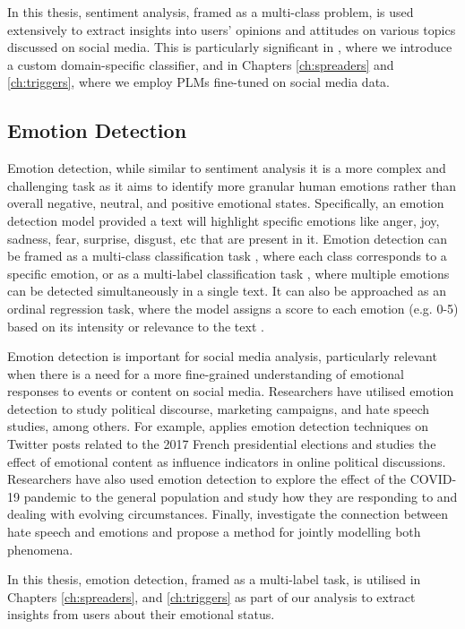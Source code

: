 In this thesis, sentiment analysis, framed as a multi-class problem,  is used extensively to extract insights into users' opinions and attitudes on various topics discussed on social media. This is particularly significant in  , where we introduce a custom domain-specific classifier, and in Chapters \ref{ch:spreaders} and \ref{ch:triggers}, where we employ \acp{PLM} fine-tuned on social media data.

\subsection{Emotion Detection}
Emotion detection, while similar to sentiment analysis it is a more complex and challenging task as it aims to identify more granular human emotions rather than overall negative, neutral, and positive emotional states. Specifically, an emotion detection model provided a text will highlight specific emotions like anger, joy, sadness, fear, surprise, disgust, etc that are present in it. Emotion detection can be framed as a multi-class classification task \cite{balabantaray2012multi}, where each class corresponds to a specific emotion, or as a multi-label classification task \cite{zhang2020emotion}, where multiple emotions can be detected simultaneously in a single text. It can also be approached as an ordinal regression task, where the model assigns a score to each emotion (e.g. 0-5) based on its intensity or relevance to the text \cite{muhammad-etal-2025-brighter}.

Emotion detection is important for social media analysis, particularly relevant when there is a need for a more fine-grained understanding of emotional responses to events or content on social media. Researchers have utilised emotion detection to study political discourse, marketing campaigns, and hate speech studies, among others. For example, \citet{bhaumik2023adapting} applies emotion detection techniques on Twitter posts related to the 2017 French presidential elections and studies the effect of emotional content as influence indicators in online political discussions. Researchers \cite{rahib2022emotion} have also used emotion detection to explore the effect of the COVID-19 pandemic to the general population and study how they are responding to and dealing with evolving circumstances. Finally, \citet{schafer2023hs} investigate the connection between hate speech and emotions and propose a method for jointly modelling both phenomena.

In this thesis, emotion detection, framed as a multi-label task, is utilised in Chapters \ref{ch:spreaders}, and \ref{ch:triggers} as part of our analysis to extract insights from users about their emotional status.

